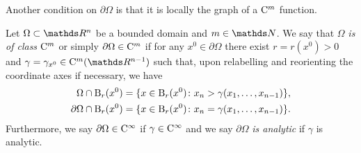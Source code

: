 Another condition on $\partial\Omega$ is that it is locally the graph of a $\mathrm{C}^m$ function.

\begin{defn}
  \label{defn:CmBoundary}
  Let $\Omega \subset \R^n$ be a bounded domain and $m \in \N$.
  We say that $\Omega$ \emph{is of class} $\mathrm{C}^m$ or simply $\partial\Omega \in \mathrm{C}^m$ if for any $x^0 \in \partial \Omega$ there exist $r = r(x^0) > 0$ and $\gamma = \gamma_{x^0} \in \CC^m(\R^{n - 1})$ such that, upon relabelling and reorienting the coordinate axes if necessary, we have
  \begin{align*}
     \Omega \cap \mathrm{B}_r(x^0) &= \{ x \in \mathrm{B}_r(x^0) \colon x_n > \gamma(x_1,\dots,x_{n - 1}) \}, \\
     \partial \Omega \cap \mathrm{B}_r(x^0) &= \{ x \in \mathrm{B}_r(x^0) \colon x_n = \gamma(x_1,\dots,x_{n - 1})\}.
  \end{align*}
  Furthermore, we say $\partial \Omega \in \mathrm{C}^\infty$ if $\gamma \in \mathrm{C}^\infty$ and we say $\partial \Omega$ \emph{is analytic} if $\gamma$ is analytic.
\end{defn}

